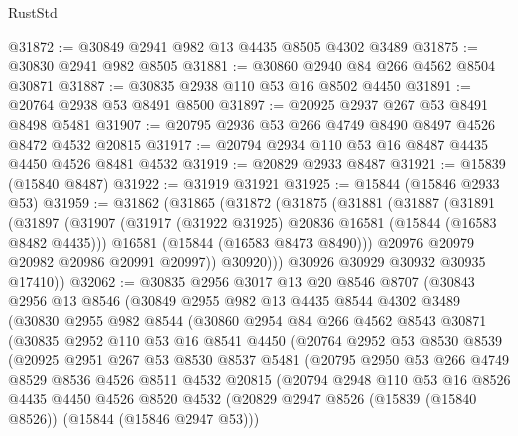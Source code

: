 \begin{lexlean}{RustStd}
\begin{coremodule}
@31872 := @30849 @2941 @982 @13 @4435 @8505 @4302 @3489
@31875 := @30830 @2941 @982 @8505
@31881 := @30860 @2940 @84 @266 @4562 @8504 @30871
@31887 := @30835 @2938 @110 @53 @16 @8502 @4450
@31891 := @20764 @2938 @53 @8491 @8500
@31897 := @20925 @2937 @267 @53 @8491 @8498 @5481
@31907 := @20795 @2936 @53 @266 @4749 @8490 @8497 @4526 @8472 @4532 @20815
@31917 := @20794 @2934 @110 @53 @16 @8487 @4435 @4450 @4526 @8481 @4532
@31919 := @20829 @2933 @8487
@31921 := @15839 (@15840 @8487)
@31922 := @31919 @31921
@31925 := @15844 (@15846 @2933 @53)
@31959 := @31862
    (@31865
      (@31872
        (@31875
          (@31881
            (@31887
              (@31891
                (@31897
                  (@31907
                    (@31917 (@31922 @31925) @20836 @16581 (@15844 (@16583 @8482 @4435)))
                    @16581
                    (@15844 (@16583 @8473 @8490)))
                  @20976
                  @20979
                  @20982
                  @20986
                  @20991
                  @20997))
              @30920)))
        @30926
        @30929
        @30932
        @30935
        @17410))
@32062 := @30835
    @2956
    @3017
    @13
    @20
    @8546
    @8707
    (@30843
      @2956
      @13
      @8546
      (@30849
        @2955
        @982
        @13
        @4435
        @8544
        @4302
        @3489
        (@30830
          @2955
          @982
          @8544
          (@30860
            @2954
            @84
            @266
            @4562
            @8543
            @30871
            (@30835
              @2952
              @110
              @53
              @16
              @8541
              @4450
              (@20764
                @2952
                @53
                @8530
                @8539
                (@20925
                  @2951
                  @267
                  @53
                  @8530
                  @8537
                  @5481
                  (@20795
                    @2950
                    @53
                    @266
                    @4749
                    @8529
                    @8536
                    @4526
                    @8511
                    @4532
                    @20815
                    (@20794
                      @2948
                      @110
                      @53
                      @16
                      @8526
                      @4435
                      @4450
                      @4526
                      @8520
                      @4532
                      (@20829 @2947 @8526 (@15839 (@15840 @8526)) (@15844 (@15846 @2947 @53)))

\end{coremodule}
\end{lexlean}
